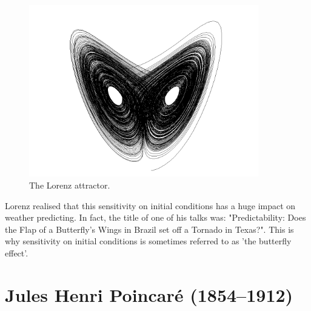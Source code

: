 \begin{figure}
\centering
\includegraphics[width=10cm]{dynamic/figures/lorenz}
\caption{The Lorenz attractor.}
\label{fig-lorenz}
\end{figure} 


Lorenz realised that this sensitivity on initial conditions has a huge impact on weather predicting. In fact, the title of one of his talks was: "Predictability: Does the Flap of a Butterfly's Wings in Brazil set off a Tornado in Texas?". This is why sensitivity on initial conditions is sometimes referred to as 'the butterfly effect'.

\pagebreak

\section*{Jules Henri Poincar\'{e} (1854--1912)}


